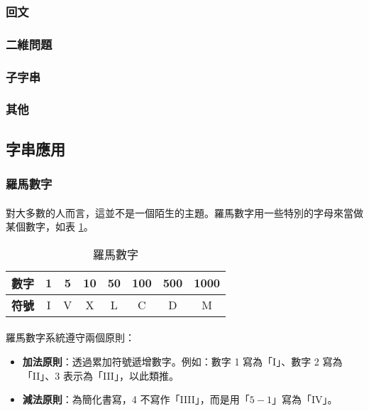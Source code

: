 \documentclass[12pt,a4paper,oneside]{article}
\begin{document}
\begin{CJK}{UTF8}{bkai}
\subsubsection{回文}

\subsubsection{二維問題}

\subsubsection{子字串}

\subsubsection{其他}


\subsection{字串應用}
\subsubsection{羅馬數字}

\paragraph{}對大多數的人而言，這並不是一個陌生的主題。羅馬數字用一些特別的字母來當做某個數字，如表 \ref{string:mani:table:roman:number}。

\begin{table}[h!]
  \centering
  \begin{tabular}{|c||c|c|c|c|c|c|c|}
  \hline
  \textbf{數字} & 1 & 5 & 10 & 50 & 100 & 500 & 1000\\
  \hline
  \textbf{符號} & I & V & X & L & C & D & M\\
  \hline
  \end{tabular}
  \caption{羅馬數字}
  \label{string:mani:table:roman:number}
\end{table}

\paragraph{}羅馬數字系統遵守兩個原則：

\begin{itemize}
\item \textbf{加法原則}：透過累加符號遞增數字。例如：數字 1 寫為「I」、數字 2 寫為「II」、3 表示為「III」，以此類推。
\item \textbf{減法原則}：為簡化書寫，4 不寫作「IIII」，而是用「$5-1$」寫為「IV」。
\end{itemize}


\end{CJK}
\end{document}

